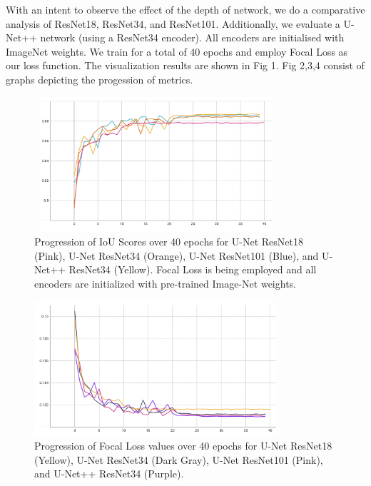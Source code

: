 \documentclass[sigconf, nonacm]{acmart}
\begin{document}
With an intent to observe the effect of the depth of network, we do a comparative analysis of ResNet18, ResNet34, and ResNet101. Additionally, we evaluate a U-Net++ network (using a ResNet34 encoder). All encoders are initialised with ImageNet weights. We train for a total of 40 epochs and employ Focal Loss as our loss function. The visualization results are shown in Fig 1. Fig 2,3,4 consist of graphs depicting the progession of metrics.

\begin{figure}[h]
    \includegraphics[width=9cm, height=5cm]{images/encoders/encoders_iou.png}
    \caption{Progression of IoU Scores over 40 epochs for U-Net ResNet18 (Pink), U-Net ResNet34 (Orange), U-Net ResNet101 (Blue), and U-Net++ ResNet34 (Yellow). Focal Loss is being employed and all encoders are initialized with pre-trained Image-Net weights.}
\end{figure}



\begin{figure}[h]
    \includegraphics[width=9cm, height=5cm]{images/encoders/encoders_focalloss.png}
    \caption{Progression of Focal Loss values over 40 epochs for U-Net ResNet18 (Yellow), U-Net ResNet34 (Dark Gray), U-Net ResNet101 (Pink), and U-Net++ ResNet34 (Purple).}
\end{figure}
\end{document}
